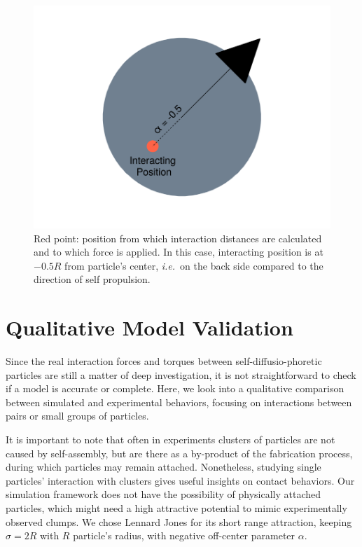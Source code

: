 \documentclass[../../master_thesis_np.tex]{subfiles}
\begin{document}
	\begin{figure}[htp]
		\centering
		\includegraphics[width=\textwidth]{singpart_draw.png}
		\caption{Red point: position from which interaction distances are calculated and to which force is applied. In this case, interacting position is at $-0.5R$ from particle's center, {\it i.e.}\ on the back side compared to  the direction of self propulsion.}
		\label{fig:geom_model}
	\end{figure}
	
	\section{Qualitative Model Validation} \label{qualitative}
	
	Since the real interaction forces and torques between self-diffusio-phoretic particles are still a matter of deep investigation, it is not straightforward to check 
	if a model is accurate or complete.
	Here, we look into a qualitative comparison between simulated and experimental behaviors, focusing on interactions between pairs or small groups of particles.
	
	It is important to note that often in experiments clusters of particles are not caused by self-assembly, but are there as a by-product of the fabrication process, during which particles may remain attached.
	Nonetheless, studying single particles' interaction with clusters gives useful insights on contact behaviors.
	Our simulation framework does not have the possibility of physically attached particles, which might need a high attractive potential to mimic experimentally observed clumps.
	We chose Lennard Jones for its short range attraction, keeping $\sigma = 2R$ with $R$ particle's radius, with negative off-center parameter $\alpha$.
	
\end{document}

